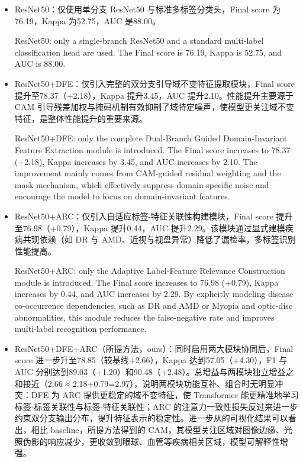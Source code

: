 \begin{itemize}
\item
  ResNet50：仅使用单分支 ResNet50 与标准多标签分类头，Final score 为76.19，Kappa 为52.75，AUC 是88.00。

  ResNet50: only a single-branch ResNet50 and a standard multi-label classification head are used. The Final score is 76.19, Kappa is 52.75, and AUC is 88.00.
\item
  ResNet50+DFE：仅引入完整的双分支引导域不变特征提取模块，Final score 提升至78.37（+2.18），Kappa 提升3.45，AUC 提升2.10。性能提升主要源于 CAM 引导残差加权与掩码机制有效抑制了域特定噪声，使模型更关注域不变特征，是整体性能提升的重要来源。

  ResNet50+DFE: only the complete Dual-Branch Guided Domain-Invariant Feature Extraction module is introduced. The Final score increases to 78.37 (+2.18), Kappa increases by 3.45, and AUC increases by 2.10. The improvement mainly comes from CAM-guided residual weighting and the mask mechanism, which effectively suppress domain-specific noise and encourage the model to focus on domain-invariant features.

\item
  ResNet50+ARC：仅引入自适应标签-特征关联性构建模块，Final score 提升至76.98（+0.79），Kappa 提升0.44，AUC 提升2.29。该模块通过显式建模疾病共现依赖（如 DR 与 AMD、近视与视盘异常）降低了漏检率，多标签识别性能提高。

  ResNet50+ARC: only the Adaptive Label-Feature Relevance Construction module is introduced. The Final score increases to 76.98 (+0.79), Kappa increases by 0.44, and AUC increases by 2.29. By explicitly modeling disease co-occurrence dependencies, such as DR and AMD or Myopia and optic-disc abnormalities, this module reduces the false-negative rate and improves multi-label recognition performance.
\item
  ResNet50+DFE+ARC（所提方法，ours）：同时启用两大模块协同后，Final score 进一步升至78.85（较基线+2.66），Kappa 达到57.05（+4.30），F1 与 AUC 分别达到89.03（+1.20）和90.48（+2.48）。总增益与两模块独立增益之和接近（2.66 ≈ 2.18+0.79=2.97），说明两模块功能互补、组合时无明显冲突：DFE 为 ARC 提供更稳定的域不变特征，使 Transformer 能更精准地学习标签-标签关联性与标签-特征关联性；ARC 的注意力一致性损失反过来进一步约束双分支输出分布，提升特征表示的稳定性。进一步从的可视化结果可以看出，相比 baseline，所提方法得到的 CAM，其模型关注区域对图像边缘、光照伪影的响应减少，更收敛到眼球、血管等疾病相关区域，模型可解释性增强。


\end{itemize}

